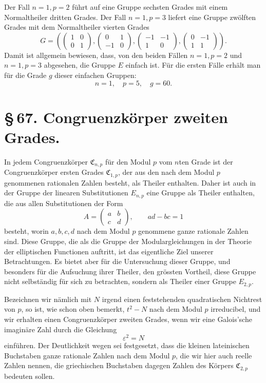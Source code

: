 \documentclass[11pt]{article}
\providecommand{\mat}[4]{\begin{pmatrix}#1&#2\\#3&#4\end{pmatrix}}
\providecommand{\mat}[4]{\begin{pmatrix}#1&#2\\#3&#4\end{pmatrix}}
\providecommand{\Cfield}{\mathfrak C}
\begin{document}
Der Fall $n=1,p=2$ führt auf eine Gruppe sechsten Grades mit einem Normaltheiler dritten Grades. Der Fall $n=1,p=3$ liefert eine Gruppe zwölften Grades mit dem Normaltheiler vierten Grades
\[
 G=\left(
 \begin{pmatrix}1&0\\0&1\end{pmatrix},
 \begin{pmatrix}0&1\\-1&0\end{pmatrix},
 \begin{pmatrix}-1&-1\\1&0\end{pmatrix},
 \begin{pmatrix}0&-1\\1&1\end{pmatrix}
 \right).
\]
Damit ist allgemein bewiesen, dass, von den beiden Fällen $n=1,p=2$ und $n=1,p=3$ abgesehen, die Gruppe $E$ einfach ist. Für die ersten Fälle erhält man für die Grade $g$ dieser einfachen Gruppen:
\[
 n=1,\quad p=5,\quad g=60.
\]




\section*{\S\,67. Congruenzkörper zweiten Grades.}

In jedem Congruenzkörper $\Cfield_{n,p}$ für den Modul $p$ vom $n$ten Grade ist der Congruenzkörper ersten Grades $\Cfield_{1,p}$, der aus den nach dem Modul $p$ genommenen rationalen Zahlen besteht, als Theiler enthalten. Daher ist auch in der Gruppe der linearen Substitutionen $E_{n,p}$ eine Gruppe als Theiler enthalten, die aus allen Substitutionen der Form
\begin{equation}
 A=\mat{a}{b}{c}{d},\qquad ad-bc=1
 \tag{1}
\end{equation}
besteht, worin $a,b,c,d$ nach dem Modul $p$ genommene ganze rationale Zahlen sind. Diese Gruppe, die als die Gruppe der Modulargleichungen in der Theorie der elliptischen Functionen auftritt, ist das eigentliche Ziel unserer Betrachtungen. Es bietet aber für die Untersuchung dieser Gruppe, und besonders für die Aufsuchung ihrer Theiler, den grössten Vortheil, diese Gruppe nicht selbständig für sich zu betrachten, sondern als Theiler einer Gruppe $E_{2,p}$.

Bezeichnen wir nämlich mit $N$ irgend einen feststehenden quadratischen Nichtrest von $p$, so ist, wie schon oben bemerkt, $t^2-N$ nach dem Modul $p$ irreducibel, und wir erhalten einen Congruenzkörper zweiten Grades, wenn wir eine Galois'sche imaginäre Zahl durch die Gleichung
\begin{equation}
 \varepsilon^2=N
 \tag{2}
\end{equation}
einführen. Der Deutlichkeit wegen sei festgesetzt, dass die kleinen lateinischen Buchstaben ganze rationale Zahlen nach dem Modul $p$, die wir hier auch reelle Zahlen nennen, die griechischen Buchstaben dagegen Zahlen des Körpers $\Cfield_{2,p}$ bedeuten sollen.
\end{document}
